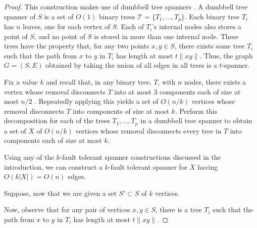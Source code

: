\documentclass{patmorin}
\begin{document}
\begin{proof} 
This construction makes use of dumbbell tree spanners \cite{X}.
A dumbbell tree spanner of $S$ is a set of $O(1)$ binary trees
$\mathcal{T}=\{T_1,\ldots,T_p\}$.  Each binary tree $T_i$ has $n$ leaves,
one for each vertex of $S$.  Each of $T_i$'s internal nodes also stores
a point of $S$, and no point of $S$ is stored in more than one internal
node.  These trees have the property that, for any two points $x,y\in S$,
there exists some tree $T_i$ such that the path from $x$ to $y$ in $T_i$
has length at most $t\|xy\|$.  Thus, the graph $G=(S,E)$ obtained by
taking the union of all edges in all trees is a $t$-spanner.

Fix a value $k$ and recall that, in any binary tree, $T$, with $n$ nodes,
there exists a vertex whose removal disconnects $T$ into at most 3
components each of size at most $n/2$ \cite{S}.  Repeatedly applying this
yields a set of $O(n/k)$ vertices whose removal disconnects $T$ into
components of size at most $k$.  Perform this decomposition for each of
the trees $T_1,\ldots,T_p$ in a dumbbell tree spanner to obtain a set
of $X$ of $O(n/k)$ vertices whose removal disconnects every tree in $T$
into components each of size at most $k$.

Using any of the $k$-fault tolerant spanner constructions discussed in
the introduction, we can construct a $k$-fault tolerant spanner for $X$
having $O(k|X|)=O(n)$ edges. 

Suppose, now that we are given a set $S'\subset S$ of $k$ vertices.

  Now, observe that for any pair of vertices
$x,y\in S$, there is a tree $T_i$ such that the path from $x$ to $y$ in $T_i$ has length at most $t\|xy\|$.



\end{proof}
\end{document}
